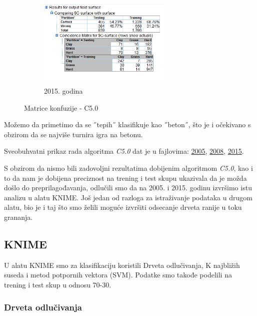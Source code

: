 \documentclass[a4paper]{article}
\begin{document}
\begin{figure}[H]
	\begin{subfigure}[h]{\textwidth}
		\begin{center}
			\includegraphics[width=0.7\textwidth]{Klasifikacija/C50/Analysis_Surface2015.png}
		\end{center}
		\caption{2015. godina}
		\label{fig:MatricaKnfuzijeC502015}
	\end{subfigure}
	
	\caption{Matrice konfuzije - C5.0}
	\label{fig:MatricaKnfuzijeC50}
\end{figure}

Možemo da primetimo da se ˝tepih˝ klasifikuje kao ˝beton˝, što je i očekivano s obzirom da se najviše turnira igra na betonu. 

Sveobuhvatni prikaz rada algoritma \textit{C5.0} dat je u fajlovima: \href{file:./Klasifikacija/C50/Summary_Surface2005.html}{2005}, \href{file:./Klasifikacija/C50/Summary_Surface2008.html}{2008}, \href{file:./Klasifikacija/C50/Summary_Surface2005.html}{2015}.  

S obzirom da nismo bili zadovoljni rezultatima dobijenim algoritmom \textit{C5.0}, kao i to da nam je dobijena preciznost na trening i test skupu ukazivala da je možda došlo do preprilagođavanja, odlučili smo da na 2005. i 2015. godinu izvršimo istu analizu u alatu KNIME. Još jedan od razloga za istraživanje podataka u drugom alatu, bio je i taj što smo želili moguće izvršiti odsecanje drveta ranije u toku grananja.

\subsection{KNIME}

U alatu KNIME smo za klasifikaciju koristili Drveta odlučivanja, K najbližih suseda i metod potpornih vektora (SVM). Podatke smo takođe podelili na trening i test skup u odnosu 70-30.

\subsubsection{Drveta odlučivanja}
\end{document}
